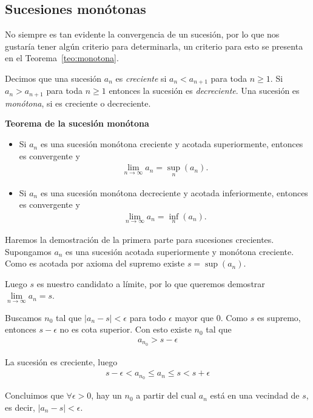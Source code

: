 \documentclass[12pt]{book}
\begin{document}
\subsection{Sucesiones monótonas}
\noindent
No siempre es tan evidente la convergencia de un sucesión, por lo que nos gustaría tener algún criterio para determinarla, un criterio para esto se presenta en el Teorema~\ref{teo:monotona}.

\begin{definitionenv}
     Decimos que una sucesión $a_n$ es \textit{creciente} si $a_{n}<a_{n+1}$ para toda $n\ge 1$. Si $a_n>a_{n+1}$ para toda $n\ge 1$ entonces la sucesión es \textit{decreciente}. Una sucesión es \textit{monótona}, si es creciente o decreciente.
\end{definitionenv}

\begin{theoremenv}\label{teo:monotona}
    \textbf{Teorema de la sucesión monótona}
    \begin{itemize}
        \item Si $a_n$ es una sucesión monótona creciente y acotada superiormente, entonces es convergente y
        \begin{align*}
            \lim\limits_{n\to\infty}a_n=\sup\limits_n(a_n).
        \end{align*}
        \item Si $a_n$ es una sucesión monótona decreciente y acotada inferiormente, entonces es convergente y
        \begin{align*}
            \lim\limits_{n\to\infty}a_n=\inf\limits_n(a_n).
        \end{align*}
    \end{itemize}
\end{theoremenv}

\begin{proofenv}

Haremos la demostración de la primera parte para sucesiones crecientes.\\

Supongamos $a_n$ es una sucesión acotada superiormente y monótona creciente. Como es acotada por axioma del supremo existe $s=\sup (a_n)$.

Luego $s$ es nuestro candidato a límite, por lo que queremos demostrar $\lim\limits_{n\to\infty}a_n=s$.

Buscamos $n_0$ tal que $|a_n-s|<\epsilon$ para todo $\epsilon$ mayor que 0. Como $s$ es supremo, entonces $s-\epsilon$ no es cota superior. Con esto existe $n_0$ tal que
\begin{align*}
    a_{n_0}>s-\epsilon
\end{align*}

La sucesión es creciente, luego
\begin{align*}
    s-\epsilon<a_{n_0}\leq a_n\leq s<s+\epsilon
\end{align*}

Concluimos que $\forall \epsilon>0$, hay un $n_0$ a partir del cual $a_n$ está en una vecindad de $s$, es decir, $|a_n-s|<\epsilon$.
\end{proofenv}
\end{document}
